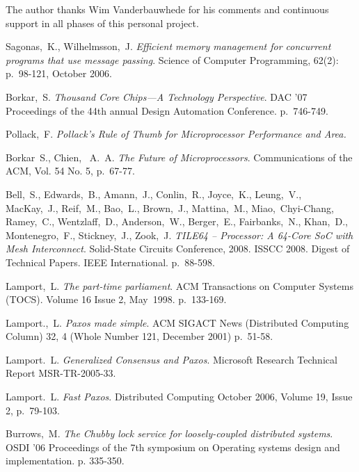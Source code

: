 \documentclass[english,11pt]{l4proj}
\begin{document}
The author thanks Wim Vanderbauwhede for his comments and continuous support in
all phases of this personal project.

\clearpage
\begin{thebibliography}{99}

     Sagonas,~K., Wilhelmsson,~J. \emph{Efficient memory
        management for concurrent programs that use message passing}. Science of
        Computer Programming, 62(2): p.~98-121, October 2006.

     Borkar,~S. \emph{Thousand Core Chips—A Technology
        Perspective}. DAC '07 Proceedings of the 44th annual Design Automation
        Conference. p.~746-749.

     Pollack,~F. \emph{Pollack's Rule of Thumb for
        Microprocessor Performance and Area.}

     Borkar~S., Chien,~ A.~A. \emph{The Future
        of Microprocessors}. Communications of the ACM, Vol. 54 No. 5, p.~67-77.

     Bell,~S., Edwards,~B., Amann,~J., Conlin,~R.,
        Joyce,~K., Leung,~V., MacKay,~J., Reif,~M., Bao,~L., Brown,~J.,
        Mattina,~M., Miao,~Chyi-Chang, Ramey,~C., Wentzlaff,~D.,
        Anderson,~W., Berger,~E., Fairbanks,~N., Khan,~D., Montenegro,~F.,
        Stickney,~J., Zook,~J. \emph{TILE64 -- Processor: A 64-Core SoC with
        Mesh Interconnect}. Solid-State Circuits Conference, 2008. ISSCC 2008.
        Digest of Technical Papers. IEEE International. p.~88-598.

     Lamport,~L. \emph{The part-time parliament}. ACM
        Transactions on Computer Systems (TOCS). Volume 16 Issue 2, May~1998.
        p.~133-169.

     Lamport.,~L. \emph{Paxos made simple}. ACM SIGACT
        News (Distributed Computing Column) 32, 4 (Whole Number 121, December
        2001) p.~51-58.

     Lamport.~L. \emph{Generalized Consensus and
        Paxos}. Microsoft Research Technical Report MSR-TR-2005-33.

     Lamport.~L. \emph{Fast Paxos}. Distributed Computing
    October 2006, Volume 19, Issue 2, p.~79-103.

     Burrows,~M. \emph{The Chubby lock service for
        loosely-coupled distributed systems}. OSDI '06 Proceedings of the 7th
        symposium on Operating systems design and implementation. p. 335-350.


\end{thebibliography}
\end{document}
